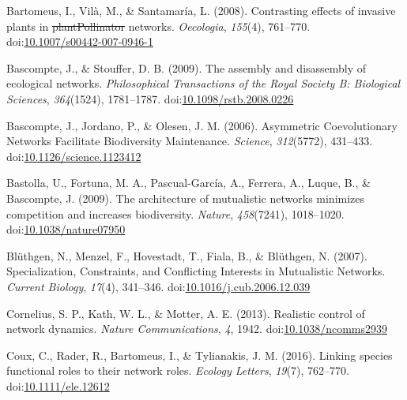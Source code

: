 \documentclass[a4paper]{artikel1}
\theoremstyle{definition}
\theoremstyle{definition}
\theoremstyle{definition}
\theoremstyle{remark}
\providecommand{\DIFaddtex}[1]{{\protect\color{blue}\uwave{#1}}} %
\providecommand{\DIFdeltex}[1]{{\protect\color{red}\sout{#1}}}                      %
\providecommand{\DIFaddbegin}{} %
\providecommand{\DIFaddend}{} %
\providecommand{\DIFdelbegin}{} %
\providecommand{\DIFdelend}{} %
\providecommand{\DIFadd}[1]{\texorpdfstring{\DIFaddtex{#1}}{#1}} %
\providecommand{\DIFdel}[1]{\texorpdfstring{\DIFdeltex{#1}}{}} %
\begin{document}
\DIFdelbegin %
\DIFdelend \DIFaddbegin \hypertarget{ref-bartomeus_contrasting_2008}{}
\DIFaddend Bartomeus, I., Vilà, M., \& Santamaría, L. (2008). Contrasting effects
of invasive plants in \DIFdelbegin \DIFdel{plantPollinator }\DIFdelend \DIFaddbegin \DIFadd{plant-pollinator }\DIFaddend networks. \emph{Oecologia},
\emph{155}(4), 761--770.
doi:\href{https://doi.org/10.1007/s00442-007-0946-1}{10.1007/s00442-007-0946-1}

\hypertarget{ref-bascompte_assembly_2009}{}
Bascompte, J., \& Stouffer, D. B. (2009). The assembly and disassembly
of ecological networks. \emph{Philosophical Transactions of the Royal
Society B: Biological Sciences}, \emph{364}(1524), 1781--1787.
doi:\href{https://doi.org/10.1098/rstb.2008.0226}{10.1098/rstb.2008.0226}

\hypertarget{ref-bascompte_asymmetric_2006}{}
Bascompte, J., Jordano, P., \& Olesen, J. M. (2006). Asymmetric
Coevolutionary Networks Facilitate Biodiversity Maintenance.
\emph{Science}, \emph{312}(5772), 431--433.
doi:\href{https://doi.org/10.1126/science.1123412}{10.1126/science.1123412}

\hypertarget{ref-bastolla_architecture_2009}{}
Bastolla, U., Fortuna, M. A., Pascual-García, A., Ferrera, A., Luque,
B., \& Bascompte, J. (2009). The architecture of mutualistic networks
minimizes competition and increases biodiversity. \emph{Nature},
\emph{458}(7241), 1018--1020.
doi:\href{https://doi.org/10.1038/nature07950}{10.1038/nature07950}

\hypertarget{ref-bluthgen_specialization_2007}{}
Blüthgen, N., Menzel, F., Hovestadt, T., Fiala, B., \& Blüthgen, N.
(2007). Specialization, Constraints, and Conflicting Interests in
Mutualistic Networks. \emph{Current Biology}, \emph{17}(4), 341--346.
doi:\href{https://doi.org/10.1016/j.cub.2006.12.039}{10.1016/j.cub.2006.12.039}

\hypertarget{ref-cornelius_realistic_2013}{}
Cornelius, S. P., Kath, W. L., \& Motter, A. E. (2013). Realistic
control of network dynamics. \emph{Nature Communications}, \emph{4},
1942. doi:\href{https://doi.org/10.1038/ncomms2939}{10.1038/ncomms2939}

\hypertarget{ref-coux_linking_2016}{}
Coux, C., Rader, R., Bartomeus, I., \& Tylianakis, J. M. (2016). Linking
species functional roles to their network roles. \emph{Ecology Letters},
\emph{19}(7), 762--770.
doi:\href{https://doi.org/10.1111/ele.12612}{10.1111/ele.12612}
\end{document}
